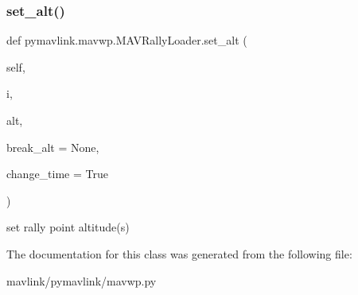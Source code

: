 \subsubsection{\texorpdfstring{set\+\_\+alt()}{set\_alt()}}
{\footnotesize\ttfamily def pymavlink.\+mavwp.\+M\+A\+V\+Rally\+Loader.\+set\+\_\+alt (\begin{DoxyParamCaption}\item[{}]{self,  }\item[{}]{i,  }\item[{}]{alt,  }\item[{}]{break\+\_\+alt = {\ttfamily None},  }\item[{}]{change\+\_\+time = {\ttfamily True} }\end{DoxyParamCaption})}

\begin{DoxyVerb}set rally point altitude(s)\end{DoxyVerb}
 

The documentation for this class was generated from the following file\+:\begin{DoxyCompactItemize}
\item 
mavlink/pymavlink/mavwp.\+py\end{DoxyCompactItemize}
